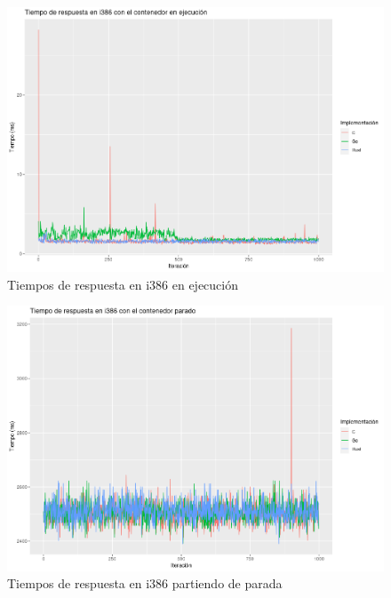 \begin{figure}
    \centering
    \includegraphics[width=\textwidth]{images/response-time/i386-running.png}
    \caption{Tiempos de respuesta en i386 en ejecución}
    \label{fig:response-time-i386-running}
\end{figure}

\begin{figure}
    \centering
    \includegraphics[width=\textwidth]{images/response-time/i386-stopped.png}
    \caption{Tiempos de respuesta en i386 partiendo de parada}
    \label{fig:response-time-i386-stopped}
\end{figure}


